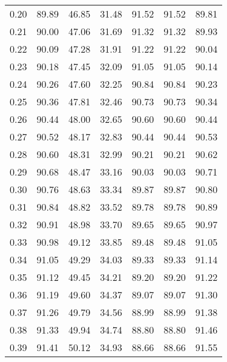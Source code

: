 \begin{tabular}{|c|c|c|c|c|c|c|}
      0.20 &     89.89 &     46.85 &      31.48 &   91.52 &      91.52 &         89.81 \\
      0.21 &     90.00 &     47.06 &      31.69 &   91.32 &      91.32 &         89.93 \\
      0.22 &     90.09 &     47.28 &      31.91 &   91.22 &      91.22 &         90.04 \\
      0.23 &     90.18 &     47.45 &      32.09 &   91.05 &      91.05 &         90.14 \\
      0.24 &     90.26 &     47.60 &      32.25 &   90.84 &      90.84 &         90.23 \\
      0.25 &     90.36 &     47.81 &      32.46 &   90.73 &      90.73 &         90.34 \\
      0.26 &     90.44 &     48.00 &      32.65 &   90.60 &      90.60 &         90.44 \\
      0.27 &     90.52 &     48.17 &      32.83 &   90.44 &      90.44 &         90.53 \\
      0.28 &     90.60 &     48.31 &      32.99 &   90.21 &      90.21 &         90.62 \\
      0.29 &     90.68 &     48.47 &      33.16 &   90.03 &      90.03 &         90.71 \\
      0.30 &     90.76 &     48.63 &      33.34 &   89.87 &      89.87 &         90.80 \\
      0.31 &     90.84 &     48.82 &      33.52 &   89.78 &      89.78 &         90.89 \\
      0.32 &     90.91 &     48.98 &      33.70 &   89.65 &      89.65 &         90.97 \\
      0.33 &     90.98 &     49.12 &      33.85 &   89.48 &      89.48 &         91.05 \\
      0.34 &     91.05 &     49.29 &      34.03 &   89.33 &      89.33 &         91.14 \\
      0.35 &     91.12 &     49.45 &      34.21 &   89.20 &      89.20 &         91.22 \\
      0.36 &     91.19 &     49.60 &      34.37 &   89.07 &      89.07 &         91.30 \\
      0.37 &     91.26 &     49.79 &      34.56 &   88.99 &      88.99 &         91.38 \\
      0.38 &     91.33 &     49.94 &      34.74 &   88.80 &      88.80 &         91.46 \\
      0.39 &     91.41 &     50.12 &      34.93 &   88.66 &      88.66 &         91.55 \\

\end{tabular}

